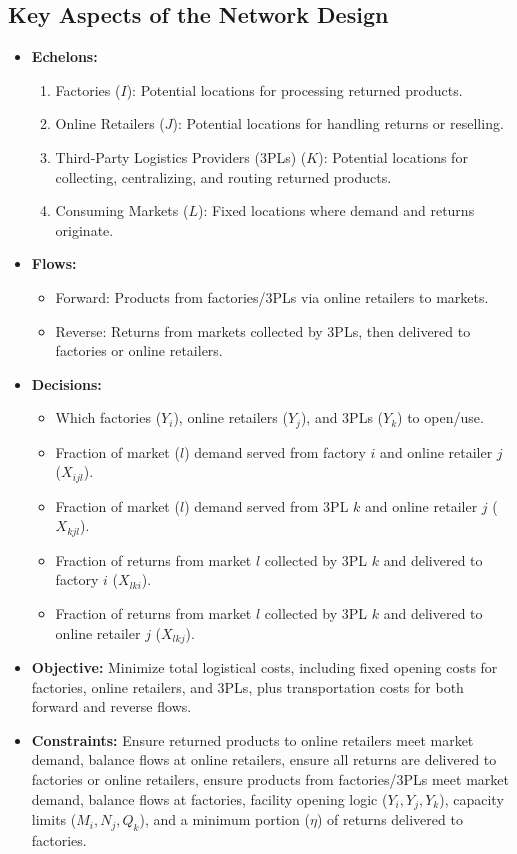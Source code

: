 \subsection*{Key Aspects of the Network Design}
\begin{itemize}
    \item \textbf{Echelons:}
        \begin{enumerate}
            \item Factories ($I$): Potential locations for processing returned products.
            \item Online Retailers ($J$): Potential locations for handling returns or reselling.
            \item Third-Party Logistics Providers (3PLs) ($K$): Potential locations for collecting, centralizing, and routing returned products.
            \item Consuming Markets ($L$): Fixed locations where demand and returns originate.
        \end{enumerate}
    \item \textbf{Flows:}
        \begin{itemize}
            \item Forward: Products from factories/3PLs via online retailers to markets.
            \item Reverse: Returns from markets collected by 3PLs, then delivered to factories or online retailers.
        \end{itemize}
    \item \textbf{Decisions:}
        \begin{itemize}
            \item Which factories ($Y_i$), online retailers ($Y_j$), and 3PLs ($Y_k$) to open/use.
            \item Fraction of market ($l$) demand served from factory $i$ and online retailer $j$ ($X_{ijl}$).
            \item Fraction of market ($l$) demand served from 3PL $k$ and online retailer $j$ ($X_{kjl}$).
            \item Fraction of returns from market $l$ collected by 3PL $k$ and delivered to factory $i$ ($X_{lki}$).
            \item Fraction of returns from market $l$ collected by 3PL $k$ and delivered to online retailer $j$ ($X_{lkj}$).
        \end{itemize}
    \item \textbf{Objective:} Minimize total logistical costs, including fixed opening costs for factories, online retailers, and 3PLs, plus transportation costs for both forward and reverse flows.
    \item \textbf{Constraints:} Ensure returned products to online retailers meet market demand, balance flows at online retailers, ensure all returns are delivered to factories or online retailers, ensure products from factories/3PLs meet market demand, balance flows at factories, facility opening logic ($Y_i, Y_j, Y_k$), capacity limits ($M_i, N_j, Q_k$), and a minimum portion ($\eta$) of returns delivered to factories.
\end{itemize}

